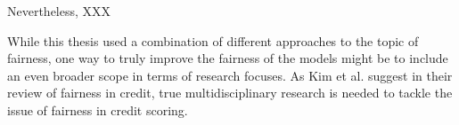 Nevertheless, XXX

While this thesis used a combination of different approaches to the topic of fairness, one way to truly improve the fairness of the models might be to include an even broader scope in terms of research focuses.
As Kim et al. \parencite{Kim2023} suggest in their review of fairness in credit, true multidisciplinary research is needed to tackle the issue of fairness in credit scoring.